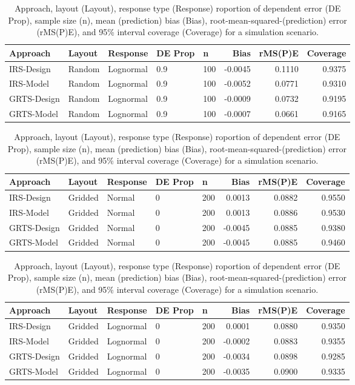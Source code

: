 \documentclass[]{elsarticle} %
\begin{document}
\begin{table}[ht]
\centering
\begin{tabular}{lllllrrr}
  \hline
Approach & Layout & Response & DE Prop & n & Bias & rMS(P)E & Coverage \\ 
  \hline
IRS-Design & Random & Lognormal & 0.9 & 100 & -0.0045 & 0.1110 & 0.9375 \\ 
  IRS-Model & Random & Lognormal & 0.9 & 100 & -0.0052 & 0.0771 & 0.9310 \\ 
  GRTS-Design & Random & Lognormal & 0.9 & 100 & -0.0009 & 0.0732 & 0.9195 \\ 
  GRTS-Model & Random & Lognormal & 0.9 & 100 & -0.0007 & 0.0661 & 0.9165 \\ 
   \hline
\end{tabular}
\caption{Approach, layout (Layout), response type (Response) roportion of dependent error (DE Prop), sample size (n), mean (prediction) bias (Bias), root-mean-squared-(prediction) error (rMS(P)E), and 95\% interval coverage (Coverage) for a simulation scenario.} 
\end{table}
\begin{table}[ht]
\centering
\begin{tabular}{lllllrrr}
  \hline
Approach & Layout & Response & DE Prop & n & Bias & rMS(P)E & Coverage \\ 
  \hline
IRS-Design & Gridded & Normal & 0 & 200 & 0.0013 & 0.0882 & 0.9550 \\ 
  IRS-Model & Gridded & Normal & 0 & 200 & 0.0013 & 0.0886 & 0.9530 \\ 
  GRTS-Design & Gridded & Normal & 0 & 200 & -0.0045 & 0.0885 & 0.9380 \\ 
  GRTS-Model & Gridded & Normal & 0 & 200 & -0.0045 & 0.0885 & 0.9460 \\ 
   \hline
\end{tabular}
\caption{Approach, layout (Layout), response type (Response) roportion of dependent error (DE Prop), sample size (n), mean (prediction) bias (Bias), root-mean-squared-(prediction) error (rMS(P)E), and 95\% interval coverage (Coverage) for a simulation scenario.} 
\end{table}
\begin{table}[ht]
\centering
\begin{tabular}{lllllrrr}
  \hline
Approach & Layout & Response & DE Prop & n & Bias & rMS(P)E & Coverage \\ 
  \hline
IRS-Design & Gridded & Lognormal & 0 & 200 & 0.0001 & 0.0880 & 0.9350 \\ 
  IRS-Model & Gridded & Lognormal & 0 & 200 & -0.0002 & 0.0883 & 0.9355 \\ 
  GRTS-Design & Gridded & Lognormal & 0 & 200 & -0.0034 & 0.0898 & 0.9285 \\ 
  GRTS-Model & Gridded & Lognormal & 0 & 200 & -0.0035 & 0.0900 & 0.9335 \\ 
   \hline
\end{tabular}
\caption{Approach, layout (Layout), response type (Response) roportion of dependent error (DE Prop), sample size (n), mean (prediction) bias (Bias), root-mean-squared-(prediction) error (rMS(P)E), and 95\% interval coverage (Coverage) for a simulation scenario.} 
\end{table}
\end{document}
